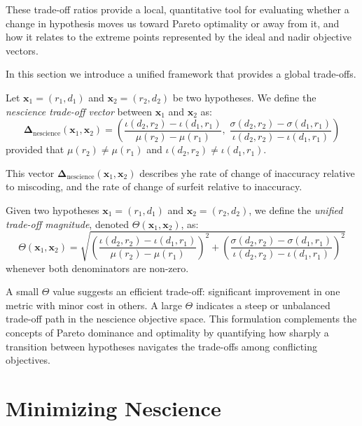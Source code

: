 These trade-off ratios provide a local, quantitative tool for evaluating whether a change in hypothesis moves us toward Pareto optimality or away from it, and how it relates to the extreme points represented by the ideal and nadir objective vectors.

In this section we introduce a unified framework that provides a global trade-offs.

\begin{definition}
Let $\mathbf{x}_1 = (r_1, d_1)$ and $\mathbf{x}_2 = (r_2, d_2)$ be two hypotheses. We define the \emph{nescience trade-off vector} between $\mathbf{x}_1$ and $\mathbf{x}_2$ as:
\[
\boldsymbol{\Delta}_{\text{nescience}}(\mathbf{x}_1, \mathbf{x}_2) =
\left(
\frac{\iota(d_2, r_2) - \iota(d_1, r_1)}{\mu(r_2) - \mu(r_1)},\;
\frac{\sigma(d_2, r_2) - \sigma(d_1, r_1)}{\iota(d_2, r_2) - \iota(d_1, r_1)}
\right)
\]
provided that $\mu(r_2) \neq \mu(r_1)$ and $\iota(d_2, r_2) \neq \iota(d_1, r_1)$.
\end{definition}

This vector $\boldsymbol{\Delta}_{\text{nescience}}(\mathbf{x}_1, \mathbf{x}_2)$ describes yhe rate of change of inaccuracy relative to miscoding, and the rate of change of surfeit relative to inaccuracy.

\begin{definition}
Given two hypotheses $\mathbf{x}_1 = (r_1, d_1)$ and $\mathbf{x}_2 = (r_2, d_2)$, we define the \emph{unified trade-off magnitude}, denoted $\Theta(\mathbf{x}_1, \mathbf{x}_2)$, as:
\[
\Theta(\mathbf{x}_1, \mathbf{x}_2) = 
\sqrt{
\left( \frac{\iota(d_2, r_2) - \iota(d_1, r_1)}{\mu(r_2) - \mu(r_1)} \right)^2 +
\left( \frac{\sigma(d_2, r_2) - \sigma(d_1, r_1)}{\iota(d_2, r_2) - \iota(d_1, r_1)} \right)^2
}
\]
whenever both denominators are non-zero.
\end{definition}

A small $\Theta$ value suggests an efficient trade-off: significant improvement in one metric with minor cost in others. A large $\Theta$ indicates a steep or unbalanced trade-off path in the nescience objective space. This formulation complements the concepts of Pareto dominance and optimality by quantifying how sharply a transition between hypotheses navigates the trade-offs among conflicting objectives.

%
%

\section{Minimizing Nescience}
\label{sec:minimizing_nescience}

